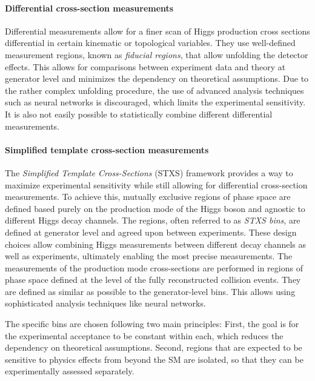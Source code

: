 \paragraph{Differential cross-section measurements}
Differential measurements allow for a finer scan of Higgs production cross sections differential in certain kinematic or topological variables.
They use well-defined measurement regions, known as \emph{fiducial regions}, that allow unfolding the detector effects. 
This allows for comparisons between experiment data and theory at generator level and minimizes the dependency on theoretical assumptions. 
Due to the rather complex unfolding procedure, the use of advanced analysis techniques such as neural networks is discouraged, which limits the experimental sensitivity.
It is also not easily possible to statistically combine different differential measurements. 


\paragraph{Simplified template cross-section measurements}
The \emph{Simplified Template Cross-Sections} (STXS) framework provides a way to maximize experimental sensitivity while still allowing for differential cross-section measurements.
To achieve this, mutually exclusive regions of phase space are defined based purely on the production mode of the Higgs boson and agnostic to different Higgs decay channels. The regions, often referred to as \emph{STXS bins}, are defined at generator level and agreed upon between experiments. 
These design choices allow combining Higgs measurements between different decay channels as well as experiments, ultimately enabling the most precise measurements.
The measurements of the production mode cross-sections are performed in regions of phase space defined at the level of the fully reconstructed collision events. They are defined as similar as possible to the generator-level bins. This allows using sophisticated analysis techniques like neural networks.

The specific bins are chosen following two main principles: First, the goal is for the experimental acceptance to be constant within each, which reduces the dependency on theoretical assumptions. Second, regions that are expected to be sensitive to physics effects from beyond the SM are isolated, so that they can be experimentally assessed separately.

